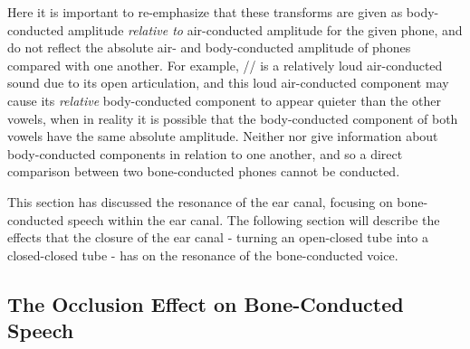 Here it is important to re-emphasize that these transforms are given as body-conducted amplitude \textit{relative to} air-conducted amplitude for the given phone, and do not reflect the absolute air- and body-conducted amplitude of phones compared with one another.  For example, /\DIFdelbegin {}\DIFdelend \DIFaddbegin {}\DIFaddend / is a relatively loud air-conducted sound due to its open articulation, and this loud air-conducted component may cause its \textit{relative} body-conducted component to appear quieter than the other vowels, when in reality it is possible that the body-conducted component of both vowels have the same absolute amplitude.  Neither \cite{bekesy:60} nor \cite{reinfeldt:10} give information about body-conducted components in relation to one another, and so a direct comparison between two bone-conducted phones cannot be conducted.

This section has discussed the resonance of the ear canal, focusing on bone-conducted speech within the ear canal.  The following section will describe the effects that the closure of the ear canal - turning an open-closed tube into a closed-closed tube - has on the resonance of the bone-conducted voice.


\subsection{The Occlusion Effect on Bone-Conducted Speech}\label{sec:OEBCspeech}



